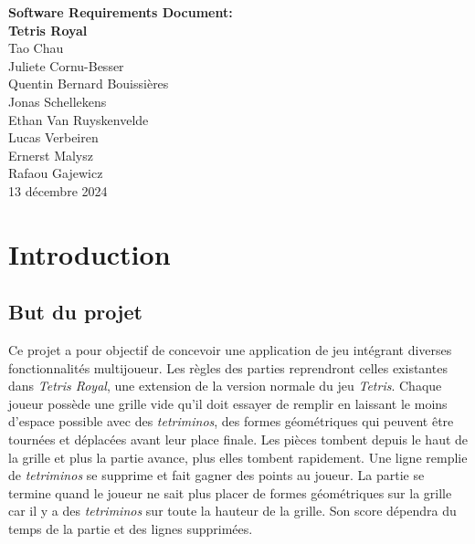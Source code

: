 \documentclass{article}
\begin{document}
\begin{titlepage}
    \centering
    \vspace*{\fill}

    {\Huge \textbf{Software Requirements Document:}\\[0.5cm]
    \textbf{Tetris Royal}} \\[1.5cm]
    
    {\Large Tao Chau\\
    Juliete Cornu-Besser\\
    Quentin Bernard Bouissières\\
    Jonas Schellekens\\
    Ethan Van Ruyskenvelde\\
    Lucas Verbeiren\\
    Ernerst Malysz\\
    Rafaou Gajewicz} \\[2cm]

    {\Large 13 décembre 2024}

    \vspace*{\fill} 
\end{titlepage}

\newpage

\tableofcontents

\newpage

\section{Introduction}

\subsection{But du projet}

\quad Ce projet a pour objectif de concevoir une application de jeu intégrant diverses fonctionnalités multijoueur. Les règles des parties reprendront celles existantes dans \textit{Tetris Royal}, une extension de la version normale du jeu \textit{Tetris}. Chaque joueur possède une grille vide qu'il doit essayer de remplir en laissant le moins d'espace possible avec des \textit{tetriminos}, des formes géométriques qui peuvent être tournées et déplacées avant leur place finale. Les pièces tombent depuis le haut de la grille et plus la partie avance, plus elles tombent rapidement. Une ligne remplie de  \textit{tetriminos} se supprime et fait gagner des points au joueur. La partie se termine quand le joueur ne sait plus placer de formes géométriques sur la grille car il y a des \textit{tetriminos} sur toute la hauteur de la grille. Son score dépendra du temps de la partie et des lignes supprimées.  
\end{document}
